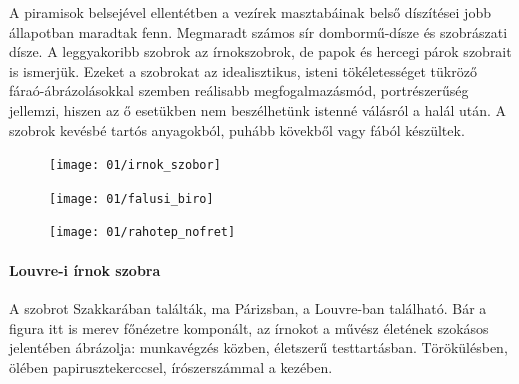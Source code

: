 A piramisok belsejével ellentétben a vezírek masztabáinak belső díszítései jobb állapotban maradtak fenn. Megmaradt számos sír dombormű-dísze és szobrászati dísze. A leggyakoribb szobrok az írnokszobrok, de papok és hercegi párok szobrait is ismerjük. Ezeket a szobrokat az idealisztikus, isteni tökéletességet tükröző fáraó-ábrázolásokkal szemben reálisabb megfogalmazásmód, portrészerűség jellemzi, hiszen az ő esetükben nem beszélhetünk istenné válásról a halál után. A szobrok kevésbé tartós anyagokból, puhább kövekből vagy fából készültek.

\begin{figure}
	\begin{minipage}{0.3\textwidth}
		\begin{tcolorbox}[enhanced,colframe=gray!50!white,
			colbacktitle=gray!15!white,
			coltitle=gray!50!black,
			borderline={0.5mm}{0mm}{gray!15!white},
			borderline={0.5mm}{0mm}{gray!50!white,dashed},
			attach boxed title to top center={yshift=-2mm},
			boxed title style={boxrule=0.4pt},
			title=Ülő írnok szobra]{
				\texttt{[image: 01/irnok\_szobor]}}
		\end{tcolorbox}
	\end{minipage}
	\begin{minipage}{0.3\textwidth}
		\begin{tcolorbox}[enhanced,colframe=gray!50!white,
			colbacktitle=gray!15!white,
			coltitle=gray!50!black,
			borderline={0.5mm}{0mm}{gray!15!white},
			borderline={0.5mm}{0mm}{gray!50!white,dashed},
			attach boxed title to top center={yshift=-2mm},
			boxed title style={boxrule=0.4pt},
			title=Falusi bíró szobra]{
				\texttt{[image: 01/falusi\_biro]}}
		\end{tcolorbox}
	\end{minipage}
	\begin{minipage}{0.3\textwidth}
		\begin{tcolorbox}[enhanced,colframe=gray!50!white,
			colbacktitle=gray!15!white,
			coltitle=gray!50!black,
			borderline={0.5mm}{0mm}{gray!15!white},
			borderline={0.5mm}{0mm}{gray!50!white,dashed},
			attach boxed title to top center={yshift=-2mm},
			boxed title style={boxrule=0.4pt},
			title=Rahotep \& Nofret]{
				\texttt{[image: 01/rahotep\_nofret]}}
		\end{tcolorbox}
	\end{minipage}
\end{figure} 

\paragraph{Louvre-i írnok szobra}
A szobrot Szakkarában találták, ma Párizsban, a Louvre-ban található. Bár a figura itt is merev főnézetre komponált, az írnokot a művész életének szokásos jelentében ábrázolja: munkavégzés közben, életszerű testtartásban. Törökülésben, ölében papirusztekerccsel, írószerszámmal a kezében. 

